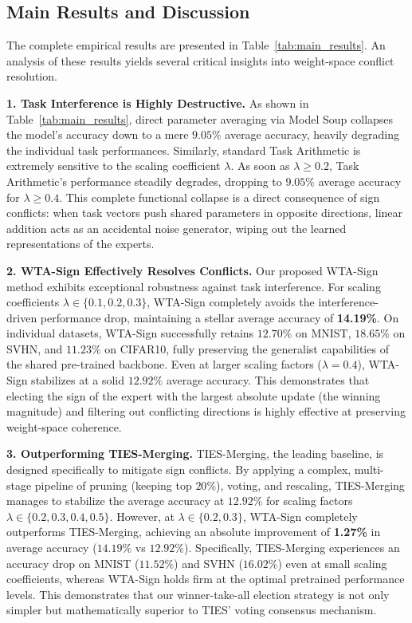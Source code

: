 \subsection{Main Results and Discussion}

The complete empirical results are presented in Table~\ref{tab:main_results}.
An analysis of these results yields several critical insights into weight-space conflict resolution.

\textbf{1. Task Interference is Highly Destructive.}
As shown in Table~\ref{tab:main_results}, direct parameter averaging via Model Soup collapses the model's accuracy down to a mere $9.05\%$ average accuracy, heavily degrading the individual task performances.
Similarly, standard Task Arithmetic is extremely sensitive to the scaling coefficient $\lambda$.
As soon as $\lambda \geq 0.2$, Task Arithmetic's performance steadily degrades, dropping to $9.05\%$ average accuracy for $\lambda \geq 0.4$.
This complete functional collapse is a direct consequence of sign conflicts: when task vectors push shared parameters in opposite directions, linear addition acts as an accidental noise generator, wiping out the learned representations of the experts.

\textbf{2. WTA-Sign Effectively Resolves Conflicts.}
Our proposed WTA-Sign method exhibits exceptional robustness against task interference.
For scaling coefficients $\lambda \in \{0.1, 0.2, 0.3\}$, WTA-Sign completely avoids the interference-driven performance drop, maintaining a stellar average accuracy of \textbf{14.19\%}.
On individual datasets, WTA-Sign successfully retains $12.70\%$ on \mbox{MNIST}, $18.65\%$ on \mbox{SVHN}, and $11.23\%$ on \mbox{CIFAR10}, fully preserving the generalist capabilities of the shared pre-trained backbone.
Even at larger scaling factors ($\lambda = 0.4$), WTA-Sign stabilizes at a solid $12.92\%$ average accuracy.
This demonstrates that electing the sign of the expert with the largest absolute update (the winning magnitude) and filtering out conflicting directions is highly effective at preserving weight-space coherence.

\textbf{3. Outperforming TIES-Merging.}
TIES-Merging, the leading baseline, is designed specifically to mitigate sign conflicts.
By applying a complex, multi-stage pipeline of pruning (keeping top $20\%$), voting, and rescaling, TIES-Merging manages to stabilize the average accuracy at $12.92\%$ for scaling factors $\lambda \in \{0.2, 0.3, 0.4, 0.5\}$.
However, at $\lambda \in \{0.2, 0.3\}$, WTA-Sign completely outperforms TIES-Merging, achieving an absolute improvement of \textbf{1.27\%} in average accuracy ($14.19\%$ vs $12.92\%$).
Specifically, TIES-Merging experiences an accuracy drop on MNIST ($11.52\%$) and SVHN ($16.02\%$) even at small scaling coefficients, whereas WTA-Sign holds firm at the optimal pretrained performance levels.
This demonstrates that our winner-take-all election strategy is not only simpler but mathematically superior to TIES' voting consensus mechanism.

